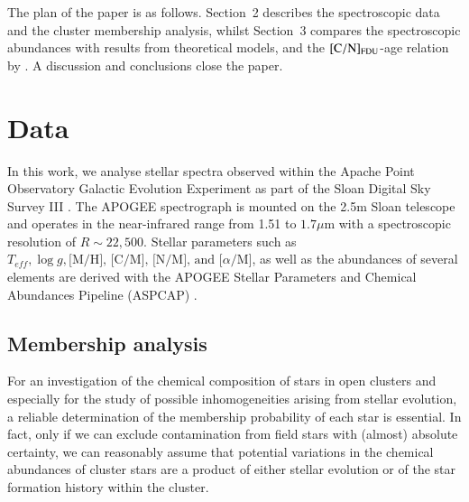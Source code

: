 \documentclass[a4paper,fleqn,usenatbib]{mnras}
\begin{document}
The plan of the paper is as follows. Section~2 describes the spectroscopic data and the cluster membership analysis, 
whilst Section~3 compares the spectroscopic abundances with results from theoretical models, 
and the ${\rm [C/N]_{FDU}}$-age relation by \citet{salaris2015}. A discussion and conclusions close the paper.




\section{Data}
\label{sec:data}

In this work, we analyse stellar spectra observed within the Apache Point Observatory Galactic Evolution Experiment \citep[APOGEE, see][]{majewski2015} as part of the Sloan Digital Sky Survey III \citep[SDSS-III, DR12, see][]{eisenstein2011,alam2015}. The APOGEE spectrograph is mounted on the 2.5m Sloan telescope and operates in the near-infrared range from 1.51 to $1.7 \mu$m with a spectroscopic resolution of $R \sim 22,500$.  Stellar parameters such as $T_{eff}, \log g, \text{[M/H], [C/M], [N/M], and [}\alpha\text{/M]}$, as well as the abundances of several elements are derived with the APOGEE Stellar Parameters and Chemical Abundances Pipeline (ASPCAP) \citep[see][]{garciaperez2015,holtzman2015}.


\subsection{Membership analysis}
\label{sec:meth}

For an investigation of the chemical composition of stars in open clusters and especially for the study of possible inhomogeneities arising from stellar evolution, a reliable determination of the membership probability of each star is essential. In fact, only if we can exclude contamination from field stars with (almost) absolute certainty, we can reasonably assume that potential variations in the chemical abundances of cluster stars are a product of either stellar evolution or of the star formation history within the cluster.
\end{document}
